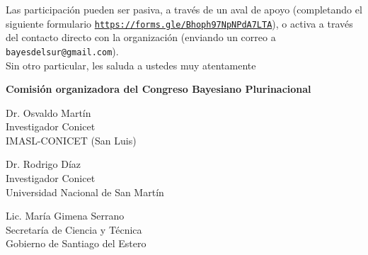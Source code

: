 \documentclass[a4paper,11pt]{article}
\begin{document}
\indent Las participación pueden ser pasiva, a través de un aval de apoyo (completando el siguiente formulario \href{https://forms.gle/Bhoph97NpNPdA7LTA}{\texttt{https://forms.gle/Bhoph97NpNPdA7LTA}}), o activa a través del contacto directo con la organización (enviando un correo a \texttt{bayesdelsur@gmail.com}). \\

\indent Sin otro particular, les saluda a ustedes muy atentamente\\


 \vspace{0.8cm}

\noindent \textbf{Comisión organizadora del Congreso Bayesiano Plurinacional}

 \vspace{0.6cm}

 \begin{paracol}{3}

  \scriptsize

\noindent Dr. Osvaldo Martín \\
Investigador Conicet \\
IMASL-CONICET (San Luis)


 \switchcolumn

\noindent Dr. Rodrigo Díaz \\
Investigador Conicet \\
Universidad Nacional de San Martín\\

 \switchcolumn

\noindent Lic. María Gimena Serrano \\
Secretaría de Ciencia y Técnica \\
Gobierno de Santiago del Estero \\

 \end{paracol}

 \vspace{0.6cm}
\end{document}
